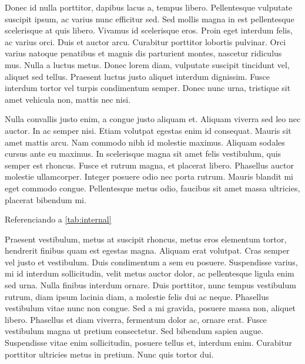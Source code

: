Donec id nulla porttitor, dapibus lacus a, tempus libero. Pellentesque vulputate suscipit ipsum, ac varius nunc efficitur sed. Sed mollis magna in est pellentesque scelerisque at quis libero. Vivamus id scelerisque eros. Proin eget interdum felis, ac varius orci. Duis et auctor arcu. Curabitur porttitor lobortis pulvinar. Orci varius natoque penatibus et magnis dis parturient montes, nascetur ridiculus mus. Nulla a luctus metus. Donec lorem diam, vulputate suscipit tincidunt vel, aliquet sed tellus. Praesent luctus justo aliquet interdum dignissim. Fusce interdum tortor vel turpis condimentum semper. Donec nunc urna, tristique sit amet vehicula non, mattis nec nisi.

\begin{table}[ht!]	
	\centering
\end{table}

Nulla convallis justo enim, a congue justo aliquam et. Aliquam viverra sed leo nec auctor. In ac semper nisi. Etiam volutpat egestas enim id consequat. Mauris sit amet mattis arcu. Nam commodo nibh id molestie maximus. Aliquam sodales cursus ante eu maximus. In scelerisque magna sit amet felis vestibulum, quis semper est rhoncus. Fusce et rutrum magna, et placerat libero. Phasellus auctor molestie ullamcorper. Integer posuere odio nec porta rutrum. Mauris blandit mi eget commodo congue. Pellentesque metus odio, faucibus sit amet massa ultricies, placerat bibendum mi.

Referenciando a \autoref{tab:internal} 

Praesent vestibulum, metus at suscipit rhoncus, metus eros elementum tortor, hendrerit finibus quam est egestas magna. Aliquam erat volutpat. Cras semper vel justo et vestibulum. Duis condimentum a sem eu posuere. Suspendisse varius, mi id interdum sollicitudin, velit metus auctor dolor, ac pellentesque ligula enim sed urna. Nulla finibus interdum ornare. Duis porttitor, nunc tempus vestibulum rutrum, diam ipsum lacinia diam, a molestie felis dui ac neque. Phasellus vestibulum vitae nunc non congue. Sed a mi gravida, posuere massa non, aliquet libero. Phasellus et diam viverra, fermentum dolor ac, ornare erat. Fusce vestibulum magna ut pretium consectetur. Sed bibendum sapien augue. Suspendisse vitae enim sollicitudin, posuere tellus et, interdum enim. Curabitur porttitor ultricies metus in pretium. Nunc quis tortor dui.

